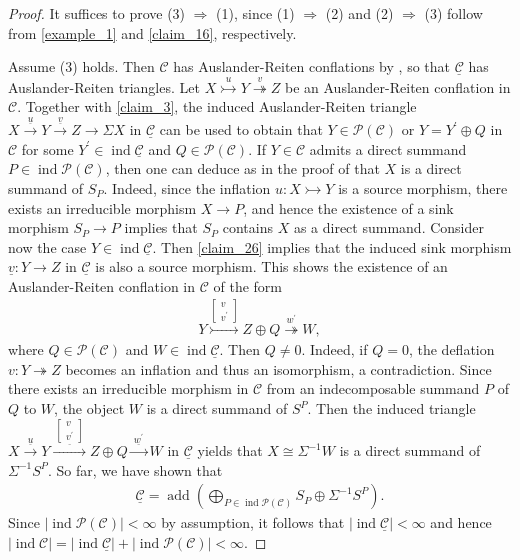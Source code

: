 \documentclass[12pt]{amsart}
\numberwithin{equation}{subsection}
\theoremstyle{plain}
\theoremstyle{definition}
\newcommand{\add}{\operatorname{add}}
\newcommand{\Proj}{\mathcal{P}}
\newcommand{\ind}{\operatorname{ind}}
\newcommand{\C}{\mathcal{C}}
\newcommand{\sC}{\underline{\mathcal{C}}}
\newcommand{\xrightarrowtail}[1]{\stackrel{#1}{\rightarrowtail}}
\newcommand{\xtwoheadrightarrow}[1]{\stackrel{#1}{\twoheadrightarrow}}
\begin{document}
\begin{proof}
It suffices to prove (3) $\Rightarrow$ (1), since (1) $\Rightarrow$ (2) and (2) $\Rightarrow$ (3) follow from \cref{example_1} and \cref{claim_16}, respectively.




Assume (3) holds.
Then $\C$ has Auslander-Reiten conflations by \cite[Lemma 3.2]{Iyama-Nakaoka-Palu_2024}, so that $\sC$ has Auslander-Reiten triangles.
Let  $X \xrightarrowtail{u} Y\xtwoheadrightarrow{v}Z$ be an Auslander-Reiten conflation in $\C$.
Together with \cref{claim_3}, the induced Auslander-Reiten triangle $X\xrightarrow{\underline{u}}Y\xrightarrow{\underline{v}}Z\to \Sigma X$ in $\sC$ can be used to obtain that  $Y\in\Proj(\C)$ or $Y = Y^\prime \oplus Q$ in $\C$ for some $Y^\prime\in\ind\sC$ and $Q\in\Proj(\C)$.
If $Y\in\C$ admits a direct summand $P \in\ind\Proj(\C)$, then one can deduce as in the proof of \cite[Proposition 3.4]{Hafezi-Bahlekeh_2024} that $X$ is a direct summand of $S_P$. 
Indeed, since the inflation $u: X \rightarrowtail Y$ is a source morphism, there exists an irreducible morphism $X\to P$, and hence the existence of a sink morphism $S_P\to P$ implies that $S_P$ contains $X$ as a direct summand. 
Consider now the case $Y\in\ind\sC$.
Then \cref{claim_26} implies that the induced sink morphism $\underline{v}: Y \to Z$ in $\sC$ is also a source morphism.
This shows the existence of an Auslander-Reiten conflation in $\C$ of the form 
\begin{align}\label{eq_5}
Y\xrightarrowtail{\left[\substack{v\\v^\prime}\right]}Z\oplus Q\xtwoheadrightarrow{w^\prime} W,
\end{align}
where $Q\in\Proj(\C)$ and $W\in\ind\sC$.
Then $Q\neq 0$. 
Indeed, if $Q=0$, the deflation $v: Y \twoheadrightarrow Z$ becomes an inflation and thus an isomorphism, a contradiction.
Since there exists an irreducible morphism in $\C$ from an indecomposable summand $P$ of $Q$ to $W$, the object $W$ is a direct summand of $S^P$.
Then the induced triangle $X \xrightarrow{\ \underline{u}\ }Y \xrightarrow{\ \underline{\left[\substack{v\\v^\prime}\right]}\ }Z\oplus Q \xrightarrow{\ \underline{w^\prime}\ }W$ in $\sC$ yields that $X \cong \Sigma^{-1}W$ is a direct summand of $\Sigma^{-1}S^P$.
So far, we have shown that 
\begin{align}
\textstyle 
\sC =\add\left(\bigoplus_{P\in\ind\Proj(\C)} S_P \oplus \Sigma^{-1}S^P\right).
\end{align}
Since $|\ind\Proj(\C)|<\infty$ by assumption, it follows that  $|\ind\sC|<\infty$ and hence $|\ind\C|=|\ind\sC|+|\ind\Proj(\C)|<\infty$.





\end{proof}
\end{document}
